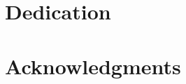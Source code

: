 \documentclass[12pt]{report}
\begin{document}
\chapter*{Dedication}
  \mydedication
\fi

\ifx\myacknowledgements\undefined
\else
  \chapter*{Acknowledgments}
  \myacknowledgements
\fi

\pagebreak


\tableofcontents

\pagebreak


\listoffigures

\pagebreak


\listoftables

\pagebreak


\pagestyle{myheadings}


\emergencystretch=10pt
\newcommand{\V}[1]{\boldsymbol{\mathbf{#1}}}
\newcommand{\vect}[1]{\boldsymbol{\mathbf{#1}}}
\newcommand{\arraybegin}[1]{\begin{IEEEeqnarraybox*}[][c]{#1}}
\newcommand{\arrayend}{\end{IEEEeqnarraybox*}}
\newcommand{\unaryminus}{\scalebox{0.75}[1.0]{\( - \)}}
\newcommand{\ubar}[1]{\underaccent{\bar}{#1}}
\end{document}
